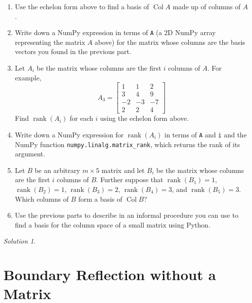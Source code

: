 \documentclass{article}
\DeclareMathOperator{\col}{Col}
\DeclareMathOperator{\rank}{rank}
\theoremstyle{remark}
\newtheorem*{solution}{Solution}
\begin{document}
\begin{enumerate}
\item Use the echelon form above to find a basis of $\col A$ made up of columns of $A$.
\item Write down a NumPy expression in terms of \texttt{A} (a 2D NumPy array representing the matrix $A$ above) for the matrix whose columns are the basis vectors you found in the previous part.
\item Let $A_i$ be the matrix whose columns are the first $i$ columns of $A$. For example,
  \begin{displaymath}
    A_3 =
    \begin{bmatrix}
      1 & 1 & 2 \\
      3 & 4 & 9 \\
      -2 & -3 & -7 \\
      2 & 2 & 4
    \end{bmatrix}
  \end{displaymath}
  Find $\rank(A_i)$ for each $i$ using the echelon form above.
\item Write down a NumPy expression for $\rank(A_i)$ in terms of \texttt{A} and \texttt{i} and the NumPy function \texttt{numpy.linalg.matrix\_rank}, which returns the rank of its argument.
\item
  Let $B$ be an arbitrary $m \times 5$ matrix and let $B_i$ be the matrix whose columns are the first $i$ columns of $B$.
  Further suppose that $\rank(B_1) = 1$, $\rank(B_2) = 1$, $\rank(B_3) = 2$, $\rank(B_4) = 3$, and $\rank(B_5) = 3$.
  Which columns of $B$ form a basis of $\col B$?
\item Use the previous parts to describe in an informal procedure you can use to find a basis for the column space of a small matrix using Python.
\end{enumerate}

\medskip

\begin{solution}
\end{solution}

\pagebreak
\section{Boundary Reflection without a Matrix}
\end{document}
